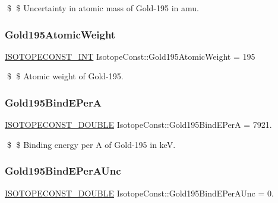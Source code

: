 \$ \$ Uncertainty in atomic mass of Gold-\/195 in amu. \mbox{\label{group___isotope_const-_gold-_au195_ga563537b208fb76e837053a846b1582bc}} 
\subsubsection{\texorpdfstring{Gold195\+Atomic\+Weight}{Gold195AtomicWeight}}
{\footnotesize\ttfamily \mbox{\hyperlink{group___isotope_const-_macros_ga5f18360b3e99483a35c32d789e62621c}{I\+S\+O\+T\+O\+P\+E\+C\+O\+N\+S\+T\+\_\+\+I\+NT}} Isotope\+Const\+::\+Gold195\+Atomic\+Weight = 195}

\$ \$ Atomic weight of Gold-\/195. \mbox{\label{group___isotope_const-_gold-_au195_ga62112757cecc44f9449c624de6bd068a}} 
\subsubsection{\texorpdfstring{Gold195\+Bind\+E\+PerA}{Gold195BindEPerA}}
{\footnotesize\ttfamily \mbox{\hyperlink{group___isotope_const-_macros_ga8f45a7272ce02c0b4c65c44636ed719a}{I\+S\+O\+T\+O\+P\+E\+C\+O\+N\+S\+T\+\_\+\+D\+O\+U\+B\+LE}} Isotope\+Const\+::\+Gold195\+Bind\+E\+PerA = 7921.}

\$ \$ Binding energy per A of Gold-\/195 in keV. \mbox{\label{group___isotope_const-_gold-_au195_ga5fcd1f6e138f1e9ffedcc43144f108ec}} 
\subsubsection{\texorpdfstring{Gold195\+Bind\+E\+Per\+A\+Unc}{Gold195BindEPerAUnc}}
{\footnotesize\ttfamily \mbox{\hyperlink{group___isotope_const-_macros_ga8f45a7272ce02c0b4c65c44636ed719a}{I\+S\+O\+T\+O\+P\+E\+C\+O\+N\+S\+T\+\_\+\+D\+O\+U\+B\+LE}} Isotope\+Const\+::\+Gold195\+Bind\+E\+Per\+A\+Unc = 0.}

